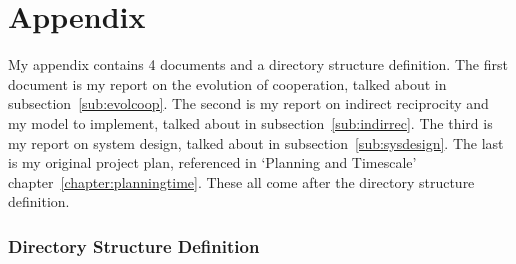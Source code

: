 \documentclass[]{final_report}
\begin{document}
\chapter{Appendix}
\label{appendix}
My appendix contains 4 documents and a directory structure definition. The first document is my report on the evolution of cooperation, talked about in subsection~\ref{sub:evolcoop}. The second is my report on indirect reciprocity and my model to implement, talked about in subsection~\ref{sub:indirrec}. The third is my report on system design, talked about in subsection~\ref{sub:sysdesign}. The last is my original project plan, referenced in `Planning and Timescale' chapter~\ref{chapter:planningtime}. These all come after the directory structure definition.\\

\subsection{Directory Structure Definition}
\end{document}

